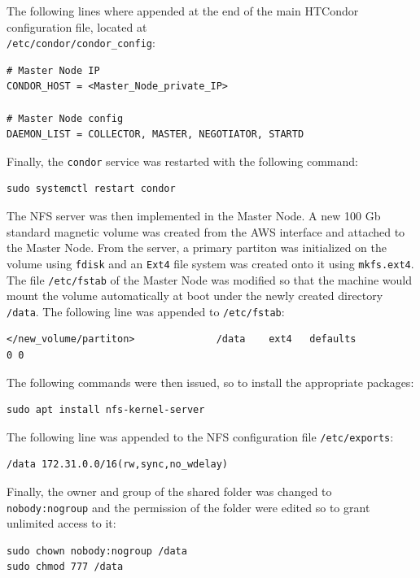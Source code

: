 \documentclass{article}
\begin{document}
The following lines where appended at the end of the main HTCondor configuration file, located at\\
\texttt{/etc/condor/condor\_config}:

\begin{lstlisting}
# Master Node IP
CONDOR_HOST = <Master_Node_private_IP>

# Master Node config 
DAEMON_LIST = COLLECTOR, MASTER, NEGOTIATOR, STARTD
\end{lstlisting}

Finally, the \texttt{condor} service was restarted with the following command:

\begin{lstlisting}
sudo systemctl restart condor
\end{lstlisting}

The NFS server was then implemented in the Master Node.
A new 100 Gb standard magnetic volume was created from the AWS interface and attached to the Master Node.
From the server, a primary partiton was initialized on the volume using \texttt{fdisk} and an \texttt{Ext4} file system was created onto it using \texttt{mkfs.ext4}.
The file \texttt{/etc/fstab} of the Master Node was modified so that the machine would mount the volume automatically at boot under the newly created directory \texttt{/data}.
The following line was appended to \texttt{/etc/fstab}:

\begin{lstlisting}
</new_volume/partiton>              /data    ext4   defaults                0 0
\end{lstlisting}

The following commands were then issued, so to install the appropriate packages:

\begin{lstlisting}
sudo apt install nfs-kernel-server
\end{lstlisting}

The following line was appended to the NFS configuration file \texttt{/etc/exports}:

\begin{lstlisting}
/data 172.31.0.0/16(rw,sync,no_wdelay)
\end{lstlisting}

Finally, the owner and group of the shared folder was changed to \texttt{nobody:nogroup} and the permission of the folder were edited so to grant unlimited access to it:

\begin{lstlisting}
sudo chown nobody:nogroup /data
sudo chmod 777 /data
\end{lstlisting}
\end{document}
